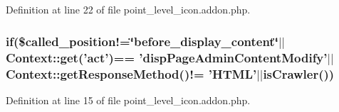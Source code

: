 Definition at line 22 of file point\+\_\+level\+\_\+icon.\+addon.\+php.

\hypertarget{point__level__icon_8addon_8php_a29031816e50a8f742422e671b2bef9b2}{
\subsubsection[{if}]{\setlength{\rightskip}{0pt plus 5cm}if(\$called\+\_\+position!=\char`\"{}before\+\_\+display\+\_\+content\char`\"{}$\vert$$\vert$Context\+::get('act')== 'disp\+Page\+Admin\+Content\+Modify'$\vert$$\vert${\bf Context\+::get\+Response\+Method}()!= 'H\+T\+M\+L'$\vert$$\vert${\bf is\+Crawler}())}}\label{point__level__icon_8addon_8php_a29031816e50a8f742422e671b2bef9b2}


Definition at line 15 of file point\+\_\+level\+\_\+icon.\+addon.\+php.

